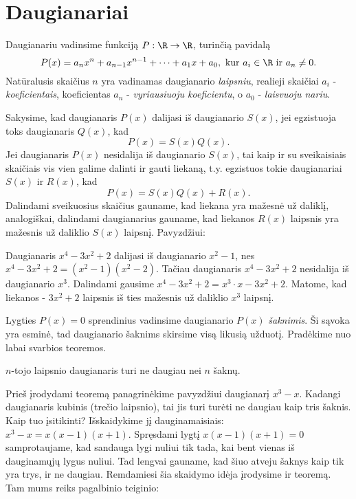 \section{Daugianariai}

Daugianariu vadinsime funkciją $P:\R \rightarrow \R$, turinčią pavidalą
$$P(x) = a_nx^n + a_{n-1}x^{n-1} + \cdots +a_1x + a_0, \text{ kur } a_i\in
\R \text{ ir } a_n \neq 0.$$
Natūralusis skaičius $n$ yra vadinamas daugianario \emph{laipsniu},
realieji skaičiai $a_i$ - \emph{koeficientais}, koeficientas $a_n$ -
\emph{vyriausiuoju koeficientu}, o $a_0$ - \emph{laisvuoju nariu}. 

Sakysime, kad daugianaris $P(x)$ dalijasi iš daugianario $S(x)$, jei
egzistuoja toks daugianaris $Q(x)$, kad $$P(x)=S(x)Q(x).$$ Jei daugianaris
$P(x)$ nesidalija iš daugianario $S(x)$, tai kaip ir su sveikaisiais
skaičiais vis vien galime dalinti ir gauti liekaną, t.y. egzistuos tokie
daugianariai $S(x)$ ir $R(x)$, kad $$P(x) = S(x)Q(x) + R(x).$$ Dalindami
sveikuosius skaičius gauname, kad liekana yra mažesnė už daliklį,
analogiškai, dalindami daugianarius gauname, kad liekanos $R(x)$ laipsnis
yra mažesnis už daliklio $S(x)$ laipsnį. Pavyzdžiui:

Daugianaris $x^4 - 3x^2 + 2$ dalijasi iš daugianario $x^2 - 1$, nes $x^4 -
3x^2 + 2 = (x^2 - 1)(x^2 - 2)$. Tačiau daugianaris $x^4 - 3x^2 + 2$
nesidalija iš daugianario $x^3$. Dalindami gausime $x^4 - 3x^2 + 2 =
x^3\cdot x - 3x^2 + 2.$ Matome, kad liekanos - $3x^2 + 2$ laipsnis iš ties
mažesnis už daliklio $x^3$ laipsnį.      

Lygties $P(x) = 0$ sprendinius vadinsime daugianario $P(x)$
\emph{šaknimis}. Ši sąvoka yra esminė, tad daugianario šaknims skirsime
visą likusią užduotį. Pradėkime nuo labai svarbios teoremos.

\begin{thm}
$n$-tojo laipsnio daugianaris turi ne daugiau nei $n$ šaknų.
\end{thm}

Prieš įrodydami teoremą panagrinėkime pavyzdžiui daugianarį $x^3 - x$.
Kadangi daugianaris kubinis (trečio laipsnio), tai jis turi turėti ne
daugiau kaip tris šaknis. Kaip tuo įsitikinti? Išskaidykime jį
dauginamaisiais: $x^3-x =x(x-1)(x+1).$ Spręsdami lygtį $x(x-1)(x+1) = 0$
samprotaujame, kad sandauga lygi nuliui tik tada, kai bent vienas iš
dauginamųjų lygus nuliui. Tad lengvai gauname, kad šiuo atveju šaknys kaip
tik yra trys, ir ne daugiau. Remdamiesi šia skaidymo idėja įrodysime ir
teoremą. Tam mums reiks pagalbinio teiginio:

